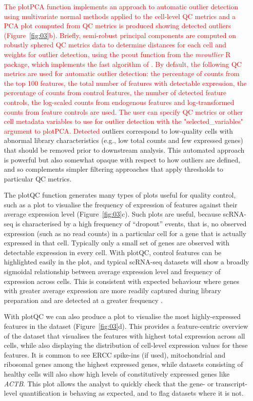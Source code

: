 \documentclass{bioinfo}
\newcommand{\revised}[1]{\textcolor{red}{#1}}
\begin{document}
\revised{The plotPCA function implements an approach to automatic outlier
detection using multivariate normal methods applied to the cell-level QC
metrics \citep{Ilicic2016-dm} and a PCA plot computed from QC metrics is produced showing detected outliers (Figure~\ref{fig:03}b). Briefly, semi-robust principal components are computed on robustly sphered QC metrics data to determine distances for each cell and weights for outlier detection, using the pcout function from the \emph{mvoutlier} R package, which implements the fast algorithm of \citet{Filzmoser2008-sy}. By default, the following QC metrics are used for automatic outlier detection: the percentage of counts from the top 100 features, the total number of features with detectable expression, the percentage of counts from control features, the number of detected feature controls, the log-scaled counts from endogenous features and log-transformed counts from feature controls are used. The user can specify QC metrics or other cell metadata variables to use for outlier detection with the "selected\_variables" argument to plotPCA. Detected} outliers
correspond to low-quality cells with abnormal library characteristics (e.g.,
low total counts and few expressed genes) that should be removed prior to
downstream analysis. This automated approach is powerful but also somewhat opaque with respect to how outliers are defined, and so complements simpler filtering approaches that apply thresholds to particular QC metrics.

The plotQC function generates many types of plots useful for quality control,
such as a plot to visualise the frequency of expression of features against their average expression level (Figure~\ref{fig:03}c). Such plots are useful, because scRNA-seq is characterised by a high frequency of ``dropout'' events,
that is, no observed expression (such as no read counts) in a particular
cell for a gene that is actually expressed in that cell. Typically only
a small set of genes are observed with detectable expression in every
cell. With plotQC, control features can be highlighted easily in the plot, and
typical scRNA-seq datasets will show a broadly sigmoidal relationship between
average expression level and frequency of expression across cells. This is
consistent with expected behaviour where genes with greater average expression
are more readily captured during library preparation and are detected at a
greater frequency \citep{Brennecke2013-zv,Kim2015-xd,Vallejos2015-ww}.

With plotQC we can also produce a plot to visualise the most
highly-expressed features in the dataset (Figure~\ref{fig:03}d). This
provides a feature-centric overview of the dataset that visualises the features
with highest total expression across all cells,
while also displaying the distribution of cell-level expression values
for these features. It is common to see ERCC spike-ins (if used),
mitochondrial and ribosomal genes among the highest expressed genes,
while datasets consisting of healthy cells will also show high levels of
constitutively expressed genes like \emph{ACTB}. This
plot allows the analyst to quickly check that the gene- or
transcript-level quantification is behaving as expected, and to flag
datasets where it is not.
\end{document}
